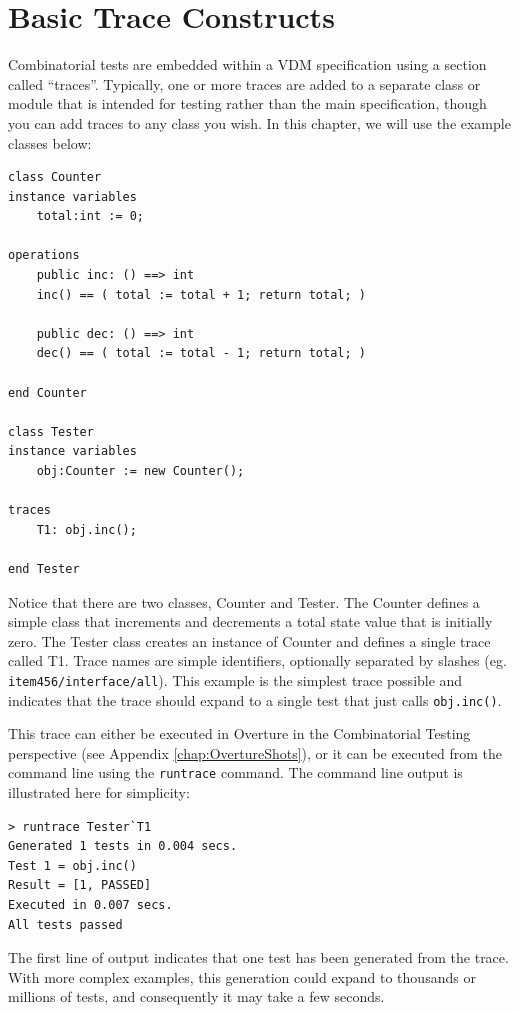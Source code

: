 \documentclass{overturerepchap}
\begin{document}
\section{Basic Trace Constructs}
Combinatorial tests are embedded within a VDM specification using a section
called ``traces''. Typically, one or more traces are added to a separate class
or module that is intended for testing rather than the main specification,
though you can add traces to any class you wish. In this chapter, we will use
the example classes below:

\small
\begin{lstlisting}
class Counter
instance variables
    total:int := 0;

operations
    public inc: () ==> int
    inc() == ( total := total + 1; return total; )

    public dec: () ==> int
    dec() == ( total := total - 1; return total; )

end Counter

class Tester
instance variables
    obj:Counter := new Counter();

traces
    T1: obj.inc();

end Tester
\end{lstlisting}
\normalsize

Notice that there are two classes, Counter and Tester. The Counter defines a
simple class that increments and decrements a total state value that is
initially zero. The Tester class creates an instance of Counter and defines a
single trace called T1. Trace names are simple identifiers, optionally separated
by slashes (eg. \texttt{item456/interface/all}). This example is the simplest
trace possible and indicates that the trace should expand to a single test that
just calls \texttt{obj.inc()}.

This trace can either be executed in Overture in the Combinatorial Testing
perspective (see Appendix \ref{chap:OvertureShots}), or it can be executed from
the command line using the \texttt{runtrace} command. The command line output is
illustrated here for simplicity:

\begin{verbatim}
> runtrace Tester`T1
Generated 1 tests in 0.004 secs. 
Test 1 = obj.inc()
Result = [1, PASSED]
Executed in 0.007 secs. 
All tests passed
\end{verbatim}

The first line of output indicates that one test has been generated from the
trace. With more complex examples, this generation could expand to thousands or
millions of tests, and consequently it may take a few seconds.
\end{document}
